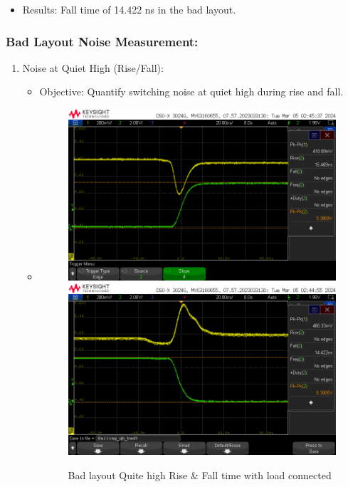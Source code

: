 \documentclass[a4paper,11pt]{article}%
\begin{document}
\begin{enumerate}
\begin{itemize}
		\item Results: Fall time of 14.422 ns in the bad layout.
	\end{itemize}
	
\end{enumerate}



\subsubsection{Bad Layout Noise Measurement:}

\begin{enumerate}
	\item Noise at Quiet High (Rise/Fall):
	\begin{itemize}
		\item Objective: Quantify switching noise at quiet high during rise and fall.
		\item 
		\begin{figure}[H]
			\centering
			\includegraphics[scale=0.6]{figures/bad/quite_high/rise/rising_qh_bad4.png}
			\includegraphics[scale=0.6]{figures/bad/quite_high/fall/falling_qh_bad3.png}
			\caption{Bad layout Quite high Rise \& Fall time with load connected}
		\end{figure}


\end{itemize}
\end{enumerate}
\end{document}
